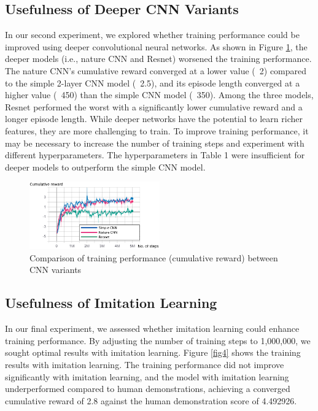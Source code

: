 \documentclass{article}
\begin{document}
\subsection{Usefulness of Deeper CNN Variants}
In our second experiment, we explored whether training performance could be improved using deeper convolutional neural networks. As shown in Figure \ref{fig3}, the deeper models (i.e., nature CNN and Resnet) worsened the training performance. The nature CNN’s cumulative reward converged at a lower value (~2) compared to the simple 2-layer CNN model (~2.5), and its episode length converged at a higher value (~450) than the simple CNN model (~350). Among the three models, Resnet performed the worst with a significantly lower cumulative reward and a longer episode length. While deeper networks have the potential to learn richer features, they are more challenging to train. To improve training performance, it may be necessary to increase the number of training steps and experiment with different hyperparameters. The hyperparameters in Table 1 were insufficient for deeper models to outperform the simple CNN model.

\begin{figure}[h]
\centering
\includegraphics[width=0.5\textwidth]{images/fig2.png}
\caption{Comparison of training performance (cumulative reward) between CNN variants}\label{fig3}
\end{figure}


\subsection{Usefulness of Imitation Learning}
In our final experiment, we assessed whether imitation learning could enhance training performance. By adjusting the number of training steps to 1,000,000, we sought optimal results with imitation learning. Figure \ref{fig4} shows the training results with imitation learning. The training performance did not improve significantly with imitation learning, and the model with imitation learning underperformed compared to human demonstrations, achieving a converged cumulative reward of 2.8 against the human demonstration score of 4.492926.
\end{document}
